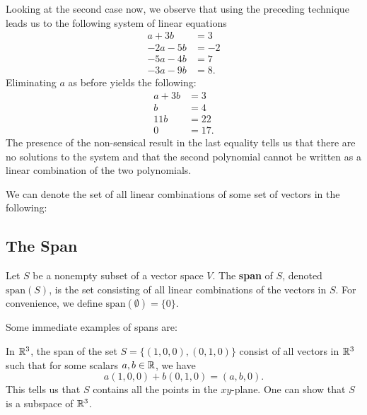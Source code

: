 \begin{eg}
    Looking at the second case now, we observe that using the preceding technique leads us to the following system of linear equations
    \begin{align*}
        a + 3b &= 3  \\
        -2a - 5b &= -2 \\
        -5a - 4b &= 7  \\
        -3a - 9b &= 8. 
    \end{align*}
    Eliminating \( a  \) as before yields the following:
    \begin{align*}
        a + 3b &= 3  \\
        b &= 4  \\
        11b &= 22 \\ 
        0 &= 17.
    \end{align*}
    The presence of the non-sensical result in the last equality tells us that there are no solutions to the system and that the second polynomial cannot be written as a linear combination of the two polynomials.
\end{eg}

We can denote the set of all linear combinations of some set of vectors in the following:

\subsection{The Span}

\begin{definition}[Span]
    Let \( S  \) be a nonempty subset of a vector space \( V  \). The \textbf{span} of \( S  \), denoted \( \text{span}(S) \), is the set consisting of all linear combinations of the vectors in \( S  \). For convenience, we define \( \text{span}(\emptyset) = \{ 0  \}  \). 
\end{definition}

Some immediate examples of spans are:
\begin{eg}
      In \( \mathbb{R}^{3}   \), the span of the set \( S =  \{ (1,0,0) , (0,1,0)  \}  \) consist of all vectors in \( \mathbb{R}^{3}  \) such that for some scalars \( a,b \in \mathbb{R}  \), we have 
        \[  a(1,0,0) + b (0,1,0) = (a,b , 0). \]
        This tells us that \( S  \) contains all the points in the \( xy \)-plane. One can show that \( S  \) is a subspace of \( \mathbb{R}^{3} \).
\end{eg}

